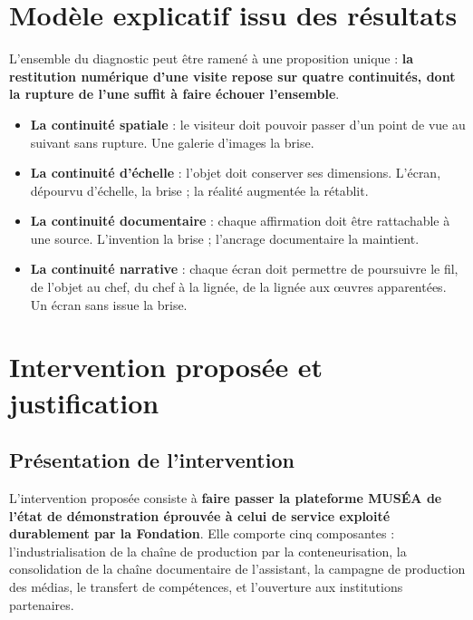 \section{Modèle explicatif issu des résultats}
\label{sec:modele}

L'ensemble du diagnostic peut être ramené à une proposition unique :
\textbf{la restitution numérique d'une visite repose sur quatre continuités,
dont la rupture de l'une suffit à faire échouer l'ensemble}.

\begin{itemize}
  \item \textbf{La continuité spatiale} : le visiteur doit pouvoir passer d'un
        point de vue au suivant sans rupture. Une galerie d'images la brise.
  \item \textbf{La continuité d'échelle} : l'objet doit conserver ses
        dimensions. L'écran, dépourvu d'échelle, la brise ; la réalité augmentée
        la rétablit.
  \item \textbf{La continuité documentaire} : chaque affirmation doit être
        rattachable à une source. L'invention la brise ; l'ancrage documentaire
        la maintient.
  \item \textbf{La continuité narrative} : chaque écran doit permettre de
        poursuivre le fil, de l'objet au chef, du chef à la lignée, de la
        lignée aux œuvres apparentées. Un écran sans issue la brise.
\end{itemize}

\section{Intervention proposée et justification}
\label{sec:intervention}

\subsection{Présentation de l'intervention}

L'intervention proposée consiste à \textbf{faire passer la plateforme MUSÉA de
l'état de démonstration éprouvée à celui de service exploité durablement par la
Fondation}. Elle comporte cinq composantes : l'industrialisation de la chaîne de
production par la conteneurisation, la consolidation de la chaîne documentaire
de l'assistant, la campagne de production des médias, le transfert de
compétences, et l'ouverture aux institutions partenaires.

